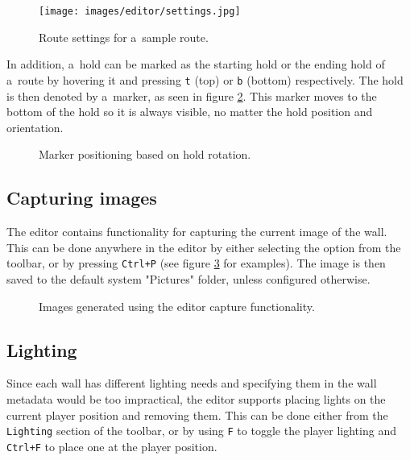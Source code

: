 \begin{figure}[t]
	\centering
	\texttt{[image: images/editor/settings.jpg]}
	\caption{Route settings for a~sample route.}%
	\label{fig:routesettings}
\end{figure}

In addition, a~hold can be marked as the starting hold or the ending hold of a~route by hovering it and pressing \verb|t| (top) or \verb|b| (bottom) respectively.
The hold is then denoted by a~marker, as seen in figure \ref{ref:topbotmarkers}.
This marker moves to the bottom of the hold so it is always visible, no matter the hold position and orientation.

\begin{figure}[h]
	\centering
	\hfill
	\hfill
	\hfill
	\caption{Marker positioning based on hold rotation.}%
	\label{ref:topbotmarkers}
\end{figure}

\subsection{Capturing images}
The editor contains functionality for capturing the current image of the wall.
This can be done anywhere in the editor by either selecting the option from the toolbar, or by pressing \verb|Ctrl+P| (see figure \ref{fig:capture} for examples).
The image is then saved to the default system "Pictures" folder, unless configured otherwise.

\begin{figure}[h]
	\centering
	\hfill
	\caption{Images generated using the editor capture functionality.}%
	\label{fig:capture}
\end{figure}

\subsection{Lighting}
Since each wall has different lighting needs and specifying them in the wall metadata would be too impractical, the editor supports placing lights on the current player position and removing them.
This can be done either from the \verb|Lighting| section of the toolbar, or by using \verb|F| to toggle the player lighting and \verb|Ctrl+F| to place one at the player position.

